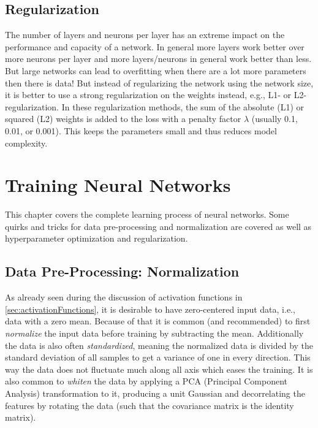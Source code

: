 	\section{Regularization}
		The number of layers and neurons per layer has an extreme impact on the performance and capacity of a network. In general more layers work better over more neurons per layer and more layers/neurons in general work better than less. But large networks can lead to overfitting when there are a lot more parameters then there is data! But instead of regularizing the network using the network size, it is better to use a strong regularization on the weights instead, e.g., L1- or L2-regularization. In these regularization methods, the sum of the absolute (L1) or squared (L2) weights is added to the loss with a penalty factor \(\lambda\) (usually \num{0.1}, \num{0.01}, or \num{0.001}). This keeps the parameters small and thus reduces model complexity.

\chapter{Training Neural Networks}
	This chapter covers the complete learning process of neural networks. Some quirks and tricks for data pre-processing and normalization are covered as well as hyperparameter optimization and regularization.


	\section{Data Pre-Processing: Normalization}
		As already seen during the discussion of activation functions in \autoref{sec:activationFunctions}, it is desirable to have zero-centered input data, i.e., data with a zero mean. Because of that it is common (and recommended) to first \emph{normalize} the input data before training by subtracting the mean. Additionally the data is also often \emph{standardized}, meaning the normalized data is divided by the standard deviation of all samples to get a variance of one in every direction. This way the data does not fluctuate much along all axis which eases the training. It is also common to \emph{whiten} the data by applying a PCA (Principal Component Analysis) transformation to it, producing a unit Gaussian and decorrelating the features by rotating the data (such that the covariance matrix is the identity matrix).

